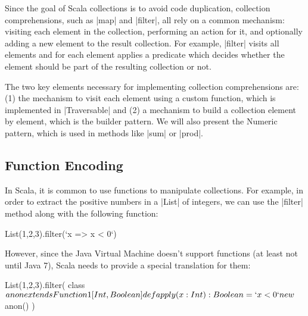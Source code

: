 
Since the goal of Scala collections is to avoid code duplication, collection comprehensions, such as |map| and |filter|, all rely on a common mechanism: visiting each element in the collection, performing an action for it, and optionally adding a new element to the result collection. For example, |filter| visits all elements and for each element applies a predicate which decides whether the element should be part of the resulting collection or not.

The two key elements necessary for implementing collection comprehensions are: (1) the mechanism to visit each element using a custom function, which is implemented in |Traversable| and (2) a mechanism to build a collection element by element, which is the builder pattern. We will also present the Numeric pattern, which is used in methods like |sum| or |prod|.

\subsection{Function Encoding}

In Scala, it is common to use functions to manipulate collections. For example, in order to extract the positive numbers in a |List| of integers, we can use the |filter| method along with the following function:

\begin{lstlisting-nobreak}
 List(1,2,3).filter(`x => x < 0`)
\end{lstlisting-nobreak}

However, since the Java Virtual Machine doesn't support functions (at least not until Java 7), Scala needs to provide a special translation for them:

\begin{lstlisting-nobreak}
 List(1,2,3).filter({
     class $anon extends Function1[Int, Boolean] {
       def apply(x: Int): Boolean = `x < 0`
     }
     new $anon()
   })
\end{lstlisting-nobreak}

